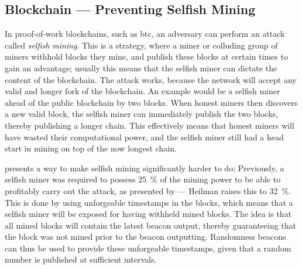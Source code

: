 \subsection{Blockchain --- Preventing Selfish Mining}\label{sub:blockchain_preventing_selfish_mining}
In proof-of-work blockchains, such as \gls{btc}, an adversary can perform an attack called \emph{selfish mining}.
This is a strategy, where a miner or colluding group of miners withhold blocks they mine, and publish these blocks at certain times to gain an advantage;
usually this means that the selfish miner can dictate the content of the blockchain.
The attack works, because the network will accept any valid and longer fork of the blockchain.
An example would be a selfish miner ahead of the public blockchain by two blocks.
When honest miners then discovers a new valid block, the selfish miner can immediately publish the two blocks, thereby publishing a longer chain.
This effectively means that honest miners will have wasted their computational power, and the selfish miner still had a head start in mining on top of the now longest chain.

\citet{heilman2014one} presents a way to make selfish mining significantly harder to do;
Previously, a selfish miner was required to possess 25~\% of the mining power to be able to profitably carry out the attack, as presented by \citet{eyal2014majority} --- Heilman raises this to 32~\%.
This is done by using unforgeable timestamps in the blocks, which means that a selfish miner will be exposed for having withheld mined blocks.
The idea is that all mined blocks will contain the latest beacon output, thereby guaranteeing that the block was not mined prior to the beacon outputting.
Randomness beacons can thus be used to provide these unforgeable timestamps, given that a random number is published at sufficient intervals.

